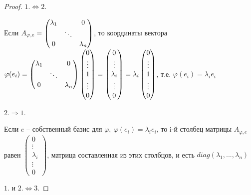 \documentclass[a4paper, 12pt]{article}
\theoremstyle{definition}
\begin{document}
    \begin{proof}
        $1. \Longleftrightarrow 2.$
        
        Если $A_{\varphi,e} = 
        \begin{pmatrix}
            \lambda_1 & \null & 0\\ \null & \ddots & \null\\
            0 & \null & \lambda_n
        \end{pmatrix}
        $, то координаты вектора\\ $\varphi(e_i) = 
        \begin{pmatrix}
            \lambda_1 & \null & 0\\ \null & \ddots & \null\\
            0 & \null & \lambda_n
        \end{pmatrix}
        \begin{pmatrix}0\\\vdots\\1\\\vdots\\0\end{pmatrix} = 
        \begin{pmatrix}0\\\vdots\\ \lambda_i\\\vdots\\0
        \end{pmatrix} = \lambda_i \begin{pmatrix}
        0\\\vdots\\1\\\vdots\\0\end{pmatrix}$, т.е.
        $\varphi(e_i) = \lambda_ie_i$
        
        $2. \Longrightarrow 1.$ 

        Если $e$ -- собственный базис для $\varphi,\ 
        \varphi(e_i) = \lambda_ie_i$, то i-й столбец матрицы
        $A_{\varphi,e}$ равен $\begin{pmatrix}0\\\vdots\\
        \lambda_i\\\vdots\\0\end{pmatrix}$, матрица составленная
        из этих столбцов, и есть $diag(\lambda_1,...,\lambda_n)$ 
    
        $1. \text{ и } 2. \Longleftrightarrow 3.$


\end{proof}
\end{document}

